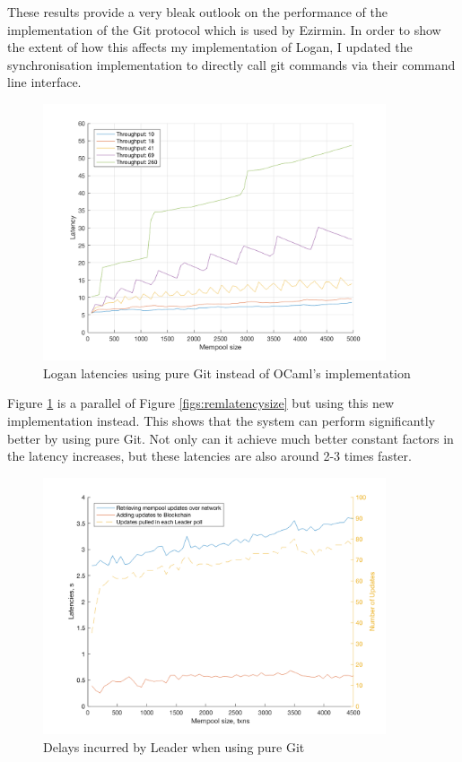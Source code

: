 \documentclass[12pt,a4paper,twoside,openright]{report}
\begin{document}
	These results provide a very bleak outlook on the performance of the implementation of the Git protocol which is used by Ezirmin.
	In order to show the extent of how this affects my implementation of Logan, I updated the synchronisation implementation to directly call git commands via their command line interface.
	\begin{figure}
		\centering
		\includegraphics[width=0.9\textwidth]{figs/latency_sizes_throughputs.png}
		\caption{Logan latencies using pure Git instead of OCaml's implementation}
		\label{figs:latenciespuregit}
	\end{figure}
	Figure \ref{figs:latenciespuregit} is a parallel of Figure \ref{figs:remlatencysize} but using this new implementation instead. 
	This shows that the system can perform significantly better by using pure Git. 
	Not only can it achieve much better constant factors in the latency increases, but these latencies are also around 2-3 times faster.
	\begin{figure}
		\centering
		\includegraphics[width=0.9\textwidth]{figs/bottlenecks.png}
		\caption{Delays incurred by Leader when using pure Git}
		\label{figs:bottleneckspuregit}
	\end{figure}
\end{document}

